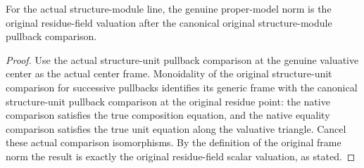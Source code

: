 \begin{lemma}
\label{lem:scheme-line-actual-model-unit-norm}
\leanok
{}
For the actual structure-module line, the genuine proper-model norm
is the original residue-field valuation after the canonical original
structure-module pullback comparison.
\end{lemma}
\begin{proof}
Use the actual structure-unit pullback comparison at the genuine
valuative center as the actual center frame. Monoidality of the
original structure-unit comparison for successive pullbacks identifies
its generic frame with the canonical structure-unit pullback
comparison at the original residue point: the native comparison
satisfies the true composition equation, and the native equality
comparison satisfies the true unit equation along the valuative
triangle. Cancel these actual comparison isomorphisms. By the
definition of the original frame norm the result is exactly the
original residue-field scalar valuation, as stated.
\end{proof}
